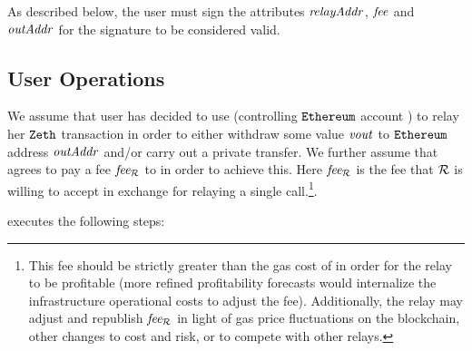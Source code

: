 As described below, the user must sign the attributes $\mathit{relayAddr}$, $\mathit{fee}$ and $\mathit{outAddr}$ for the signature to be considered valid.

\subsection{User Operations}

We assume that user \userZethAccount{} has decided to use \relayP{} (controlling $\texttt{Ethereum}$ account \relayEthAccount{}) to relay her $\texttt{Zeth}$ transaction in order to either withdraw some value $\mathit{vout}$ to $\texttt{Ethereum}$ address $\mathit{outAddr}$ and/or carry out a private transfer. We further assume that \userZethAccount{} agrees to pay a fee $\mathit{fee_{\mathcal{R}}}$ to \relayEthAccount{} in order to achieve this. Here $\mathit{fee_{\mathcal{R}}}$ is the fee that $\mathcal{R}$ is willing to accept in exchange for relaying a single \mix{} call.\footnote{This fee should be strictly greater than the gas cost of \mix{} in order for the relay to be profitable (more refined profitability forecasts would internalize the infrastructure operational costs to adjust the fee). Additionally, the relay may adjust and republish $\mathit{fee_{\mathcal{R}}}$ in light of gas price fluctuations on the blockchain, other changes to cost and risk, or to compete with other relays.}.

\userZethAccount{} executes the following steps:

